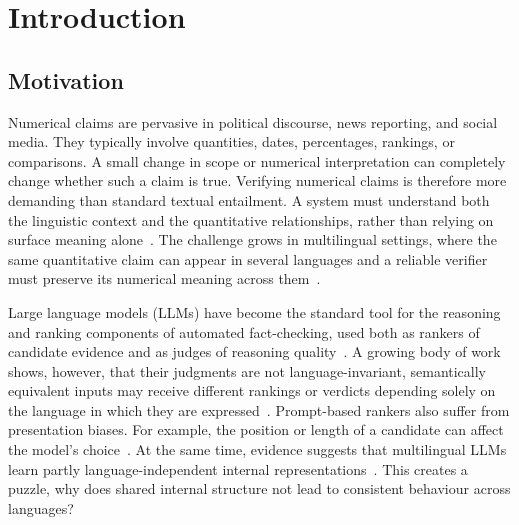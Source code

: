 
\section{Introduction}
\label{sec:introduction}

\subsection{Motivation}
\label{sec:motivation}

Numerical claims are pervasive in political discourse, news reporting, and social media. They
typically involve quantities, dates, percentages, rankings, or comparisons. A small change in scope
or numerical interpretation can completely change whether such a claim is true. Verifying numerical
claims is therefore more demanding than standard textual entailment. A system must understand both
the linguistic context and the quantitative relationships, rather than relying on surface meaning
alone~\cite{mishra2022numgluesuitefundamentalchallenging,rahman2025fragilenumbersenseprobing}. The
challenge grows in multilingual settings, where the same quantitative claim can appear in several
languages and a reliable verifier must preserve its numerical meaning across them~\cite{huang2024survey}.

Large language models (LLMs) have become the standard tool for the reasoning and ranking components of
automated fact-checking, used both as rankers of candidate evidence and as judges of reasoning
quality~\cite{sahitaj2025automatedfactcheckingrealworldclaims,qin2024largelanguagemodelseffective}.
A growing body of work shows, however, that their judgments are not language-invariant, semantically
equivalent inputs may receive different rankings or verdicts depending solely on the language in which
they are expressed~\cite{fu2025reliablemultilingualllmasajudge}. Prompt-based rankers also suffer from
presentation biases. For example, the position or length of a candidate can affect the model's
choice~\cite{shi2025judgingjudgessystematicstudy}. At the same time, evidence suggests that multilingual
LLMs learn partly language-independent internal
representations~\cite{wendler2024llamasworkenglishlatent,STOLLE2026100250}. This creates a puzzle, why
does shared internal structure not lead to consistent behaviour across languages?

